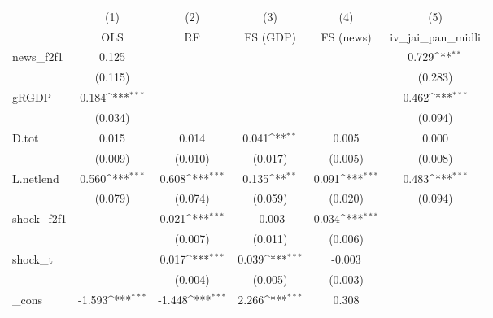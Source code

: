 {
\def\sym#1{\ifmmode^{#1}\else\(^{#1}\)\fi}
\begin{tabular}{l*{5}{c}}
\toprule
            &\multicolumn{1}{c}{(1)}&\multicolumn{1}{c}{(2)}&\multicolumn{1}{c}{(3)}&\multicolumn{1}{c}{(4)}&\multicolumn{1}{c}{(5)}\\
            &\multicolumn{1}{c}{OLS}&\multicolumn{1}{c}{RF}&\multicolumn{1}{c}{FS (GDP)}&\multicolumn{1}{c}{FS (news)}&\multicolumn{1}{c}{iv\_jai\_pan\_midli}\\
\midrule
news\_f2f1   &       0.125         &                     &                     &                     &       0.729\sym{**} \\
            &     (0.115)         &                     &                     &                     &     (0.283)         \\
\addlinespace
gRGDP       &       0.184\sym{***}&                     &                     &                     &       0.462\sym{***}\\
            &     (0.034)         &                     &                     &                     &     (0.094)         \\
\addlinespace
D.tot       &       0.015         &       0.014         &       0.041\sym{**} &       0.005         &       0.000         \\
            &     (0.009)         &     (0.010)         &     (0.017)         &     (0.005)         &     (0.008)         \\
\addlinespace
L.netlend   &       0.560\sym{***}&       0.608\sym{***}&       0.135\sym{**} &       0.091\sym{***}&       0.483\sym{***}\\
            &     (0.079)         &     (0.074)         &     (0.059)         &     (0.020)         &     (0.094)         \\
\addlinespace
shock\_f2f1  &                     &       0.021\sym{***}&      -0.003         &       0.034\sym{***}&                     \\
            &                     &     (0.007)         &     (0.011)         &     (0.006)         &                     \\
\addlinespace
shock\_t     &                     &       0.017\sym{***}&       0.039\sym{***}&      -0.003         &                     \\
            &                     &     (0.004)         &     (0.005)         &     (0.003)         &                     \\
\addlinespace
\_cons      &      -1.593\sym{***}&      -1.448\sym{***}&       2.266\sym{***}&       0.308         &                     \\

\end{tabular}}
